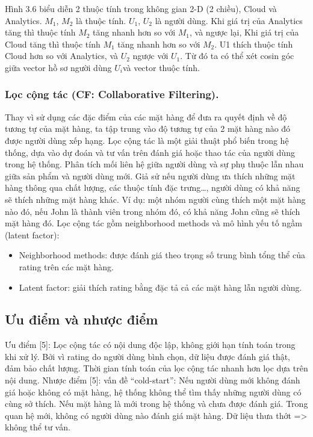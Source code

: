 \documentclass[a4paper,12pt,numbered,print,index,custombib, oneside, custommargin]{report}
\begin{document}
Hình 3.6 biểu diễn 2 thuộc tính trong không gian 2-D (2 chiều), Cloud và Analytics. $M_1$, $M_2$ là thuộc tính. $U_1$, $U_2$ là người dùng. Khi giá trị của Analytics tăng thì thuộc tính $M_2$ tăng nhanh hơn so với $M_1$, và ngược lại, Khi giá trị của Cloud tăng thì thuộc tính $M_1$ tăng nhanh hơn so với $M_2$. U1 thích thuộc tính Cloud hơn so với Analytics, và $U_2$ ngược với $U_1$. Từ đó ta có thể xét cosin góc giữa vector hồ sơ người dùng $U_i$và vector thuộc tính.


\subsubsection{Lọc cộng tác (CF: Collaborative Filtering).}
Thay vì sử dụng các đặc điểm của các mặt hàng để đưa ra quyết định về độ tương tự của mặt hàng, ta tập trung vào độ tương tự của 2 mặt hàng nào đó được người dùng xếp hạng. 
Lọc cộng tác là một giải thuật phổ biến trong hệ thống, dựa vào dự đoán và tư vấn trên đánh giá hoặc thao tác của người dùng trong hệ thống. Phân tích mối liên hệ giữa người dùng và sự phụ thuộc lẫn nhau giữa sản phẩm và người dùng mới.
Giả sử nếu người dùng ưa thích những mặt hàng thông qua chất lượng, các thuộc tính đặc trưng…, người dùng có khả năng sẽ thích những mặt hàng khác. Ví dụ: một nhóm người cùng thích một mặt hàng nào đó, nếu John là thành viên trong nhóm đó, có khả năng John cũng sẽ thích mặt hàng đó.
Lọc cộng tác gồm neighborhood methods và mô hình yếu tố ngầm (latent factor):
\begin{itemize}
\item Neighborhood methods: được đánh giá theo trọng số trung bình tổng thể của rating trên các mặt hàng.
\item Latent factor: giải thích rating bằng đặc tả cả các mặt hàng lẫn người dùng.
\end{itemize}

\subsection{Ưu điểm và nhược điểm}
Ưu điểm [5]:   Lọc cộng tác có nội dung độc lập, không giới hạn tính toán trong khi xử lý. Bởi vì rating do người dùng bình chọn, dữ liệu được đánh giá thật, đảm bảo chất lượng. Thời gian tính toán của lọc cộng tác nhanh hơn lọc dựa trên nội dung.
Nhược điểm [5]:  vấn đề “cold-start”:  Nếu người dùng mới không đánh giá hoặc không có mặt hàng, hệ thống không thể tìm thấy những người dùng có cùng sở thích. Nếu mặt hàng là mới trong hệ thống và chưa được đánh giá. Trong quan hệ mới, không có người dùng nào đánh giá mặt hàng. Dữ liệu thưa thớt => không thể tư vấn.	
\end{document}
